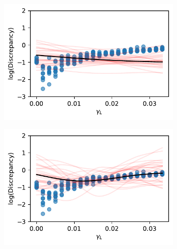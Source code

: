 \begin{figure}[htbp]
    \centering
    \begin{subfigure}[b]{0.5\textwidth}
        \centering
        \includegraphics[width=\textwidth]{
            ../champagne_GP_images/initial_gamma_L_slice_log_discrep.pdf
        }
    \end{subfigure}%
    \hfill%
    \begin{subfigure}[b]{0.5\textwidth}
        \centering
        \includegraphics[width=\textwidth]{
            ../champagne_GP_images/gamma_L_slice_100_bolfi_updates_log_discrep.pdf
        }
    \end{subfigure}
    \hfill%
    \begin{subfigure}[b]{0.5\textwidth}
        \centering

\end{subfigure}
\end{figure}
